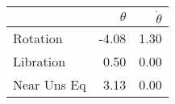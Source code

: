 \begin{tabular}{lrr}
\toprule
{} &  $\theta$ &  $\dot{\theta}$ \\
\midrule
Rotation    &     -4.08 &             1.30 \\
Libration   &      0.50 &             0.00 \\
Near Uns Eq &      3.13 &             0.00 \\
\bottomrule
\end{tabular}
